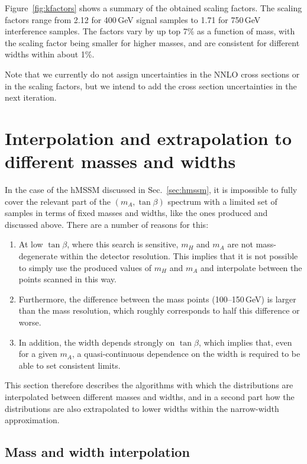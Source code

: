 Figure~\ref{fig:kfactors} shows a summary of the obtained scaling factors.
The scaling factors range from 2.12 for 400\,GeV signal samples to 1.71 for 750\,GeV interference samples.
The factors vary by up top 7\% as a function of mass, with the scaling factor being smaller for higher masses, and are consistent for different widths within about 1\%.

Note that we currently do not assign uncertainties in the NNLO cross sections or in the scaling factors, but we intend to add the cross section uncertainties in the next iteration.

\section{Interpolation and extrapolation to different masses and widths}
\label{sec:morphing}
In the case of the hMSSM discussed in Sec.~\ref{sec:hmssm}, it is impossible to fully cover the relevant part of the $(m_A, \tan\beta)$ spectrum with a limited set of samples in terms of fixed masses and widths, like the ones produced and discussed above.
There are a number of reasons for this:

\begin{enumerate}
        \item At low $\tan\beta$, where this search is sensitive, $m_H$ and $m_A$ are not mass-degenerate within the detector resolution. This implies that it is not possible to simply use the produced values of $m_H$ and $m_A$ and interpolate between the points scanned in this way.
        \item Furthermore, the difference between the mass points (100--150\,GeV) is larger than the mass resolution, which roughly corresponds to half this difference or worse.
        \item In addition, the width depends strongly on $\tan\beta$, which implies that, even for a given $m_A$, a quasi-continuous dependence on the width is required to be able to set consistent limits.
\end{enumerate}

This section therefore describes the algorithms with which the distributions are interpolated between different masses and widths, and in a second part how the distributions are also extrapolated to lower widths within the narrow-width approximation.

\subsection{Mass and width interpolation}

